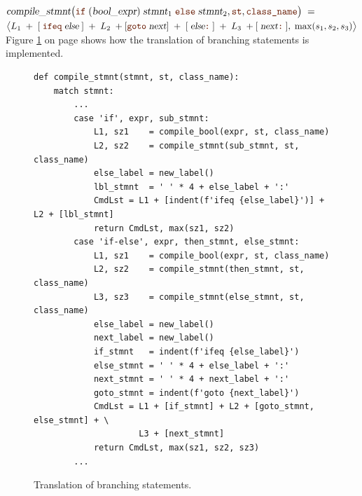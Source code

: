 \hspace*{0.0cm}
$ \textsl{compile\_stmnt}\bigl(\mytt{if}\;
     (\textsl{bool\_expr})\;\textsl{stmnt}_1\;\mytt{else}\;\textsl{stmnt}_2, \mytt{st},
     \mytt{class\_name}\bigr) \; = $
\\[0.2cm]
\hspace*{1.3cm}
$\bigl\langle  L_1 \;+\;  
    [\;\mytt{ifeq}\;\textsl{else}\;] \;+\;
    L_2 \;+ 
    [\mytt{goto}\;\textsl{next}] \;+\;
    [\;\textsl{else}\mytt{:}\;] \;+\;
    L_3 \;+ 
    [\;\textsl{next}\mytt{:}\;],\; \max(s_1, s_2, s_3) \bigr\rangle        
$
\\[0.2cm]
Figure \ref{fig:Compiler.ipynb:compile:if} on page \pageref{fig:Compiler.ipynb:compile:if} shows how the
translation of branching statements is implemented.

\begin{figure}[!ht]
\centering
\begin{verbatim}
def compile_stmnt(stmnt, st, class_name):
    match stmnt:
        ...
        case 'if', expr, sub_stmnt:
            L1, sz1    = compile_bool(expr, st, class_name)
            L2, sz2    = compile_stmnt(sub_stmnt, st, class_name)
            else_label = new_label()
            lbl_stmnt  = ' ' * 4 + else_label + ':'
            CmdLst = L1 + [indent(f'ifeq {else_label}')] + L2 + [lbl_stmnt]
            return CmdLst, max(sz1, sz2)
        case 'if-else', expr, then_stmnt, else_stmnt:
            L1, sz1    = compile_bool(expr, st, class_name)
            L2, sz2    = compile_stmnt(then_stmnt, st, class_name)
            L3, sz3    = compile_stmnt(else_stmnt, st, class_name)
            else_label = new_label()
            next_label = new_label()
            if_stmnt   = indent(f'ifeq {else_label}')
            else_stmnt = ' ' * 4 + else_label + ':'
            next_stmnt = ' ' * 4 + next_label + ':'
            goto_stmnt = indent(f'goto {next_label}')
            CmdLst = L1 + [if_stmnt] + L2 + [goto_stmnt, else_stmnt] + \
                     L3 + [next_stmnt]
            return CmdLst, max(sz1, sz2, sz3)
        ...
\end{verbatim}
\vspace*{-0.3cm}
\caption{Translation of branching statements.}
\label{fig:Compiler.ipynb:compile:if}
\end{figure}

